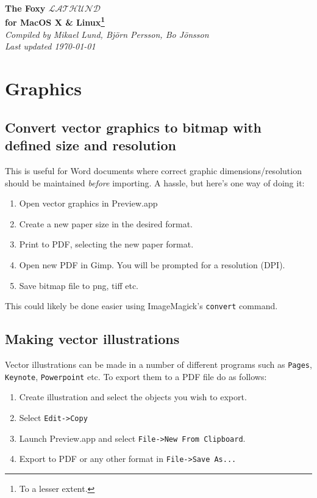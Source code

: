 \documentclass[a4paper,10pt]{article}
\begin{document}
\renewcommand{\thefootnote}{\fnsymbol{footnote}}%

\begin{center}
\Huge
\textbf{The Foxy $\mathcal{LATHUND}$\\ for MacOS X \& Linux\footnote[2]{To a lesser extent.}}\\
\normalsize
\vspace{0.5cm}
\emph{Compiled by Mikael Lund, Bj\"orn Persson, Bo J\"onsson\\
Last updated \today}
\end{center}

\tableofcontents



\section{Graphics}
\subsection{Convert vector graphics to bitmap with defined size and resolution}
This is useful for Word documents where correct graphic dimensions/resolution should be maintained \emph{before} importing. A hassle, but here's one way of doing it:
\begin{enumerate}
\item Open vector graphics in Preview.app
\item Create a new paper size in the desired format.
\item Print to PDF, selecting the new paper format.
\item Open new PDF in Gimp. You will be prompted for a resolution (DPI).
\item Save bitmap file to png, tiff etc.
\end{enumerate}
This could likely be done easier using ImageMagick's \verb"convert" command.

\subsection{Making vector illustrations}
Vector illustrations can be made in a number of different programs such as
\verb+Pages+, \verb+Keynote+, \verb+Powerpoint+ etc. To export them to a PDF file do as follows:
\begin{enumerate}
\item Create illustration and select the objects you wish to export.
\item Select \verb+Edit->Copy+
\item Launch Preview.app and select \verb+File->New From Clipboard+.
\item Export to PDF or any other format in \verb+File->Save As...+
\end{enumerate}
\end{document}
